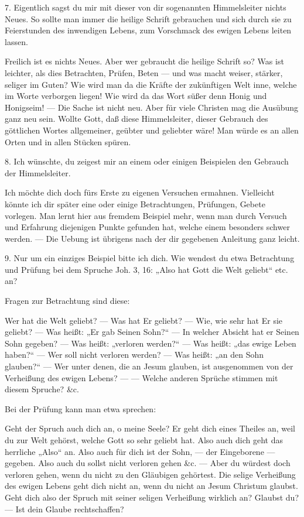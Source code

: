 7. Eigentlich sagst du mir mit dieser von dir sogenannten Himmelsleiter nichts Neues. So sollte man immer die heilige Schrift gebrauchen und sich durch sie zu Feierstunden des inwendigen Lebens, zum Vorschmack des ewigen Lebens leiten lassen.

Freilich ist es nichts Neues. Aber wer gebraucht die heilige Schrift so? Was ist leichter, als dies Betrachten, Prüfen, Beten — und was macht weiser, stärker, seliger im Guten? Wie wird man da die Kräfte der zukünftigen Welt inne, welche im Worte verborgen liegen! Wie wird da das Wort süßer denn Honig und Honigseim! — Die Sache ist nicht neu. Aber für viele Christen mag die Ausübung ganz neu sein. Wollte Gott, daß diese Himmelsleiter, dieser Gebrauch des göttlichen Wortes allgemeiner, geübter und geliebter wäre! Man würde es an allen Orten und in allen Stücken spüren.

8. Ich wünschte, du zeigest mir an einem oder einigen Beispielen den Gebrauch der Himmelsleiter.

Ich möchte dich doch fürs Erste zu eigenen Versuchen ermahnen. Vielleicht könnte ich dir später eine oder einige Betrachtungen, Prüfungen, Gebete vorlegen. Man lernt hier aus fremdem Beispiel mehr, wenn man durch Versuch und Erfahrung diejenigen Punkte gefunden hat, welche einem besonders schwer werden. — Die Uebung ist übrigens nach der dir gegebenen Anleitung ganz leicht.

9. Nur um ein einziges Beispiel bitte ich dich. Wie wendest du etwa Betrachtung und Prüfung bei dem Spruche Joh. 3, 16: „Also hat Gott die Welt geliebt“ etc. an?

Fragen zur Betrachtung sind diese:

Wer hat die Welt geliebt? — Was hat Er geliebt? — Wie, wie sehr hat Er sie geliebt? — Was heißt: „Er gab Seinen Sohn?“ — In welcher Absicht hat er Seinen Sohn gegeben? — Was heißt: „verloren werden?“ —
Was heißt: „das ewige Leben haben?“ — Wer soll nicht verloren werden? — Was heißt: „an den Sohn glauben?“ — Wer unter denen, die an Jesum glauben, ist ausgenommen von der Verheißung des ewigen Lebens? — — Welche anderen Sprüche stimmen mit diesem Spruche? \&c.

Bei der Prüfung kann man etwa sprechen:

Geht der Spruch auch dich an, o meine Seele? Er geht dich eines Theiles an, weil du zur Welt gehörst, welche Gott so sehr geliebt hat. Also auch dich geht das herrliche „Also“ an. Also auch für dich ist der Sohn, — der Eingeborene — gegeben. Also auch du sollst nicht verloren gehen \&c. — Aber du würdest doch verloren gehen, wenn du nicht zu den Gläubigen gehörtest. Die selige Verheißung des ewigen Lebens geht dich nicht an, wenn du nicht an Jesum Christum glaubst. Geht dich also der Spruch mit seiner seligen Verheißung wirklich an? Glaubst du? — Ist dein Glaube rechtschaffen?

